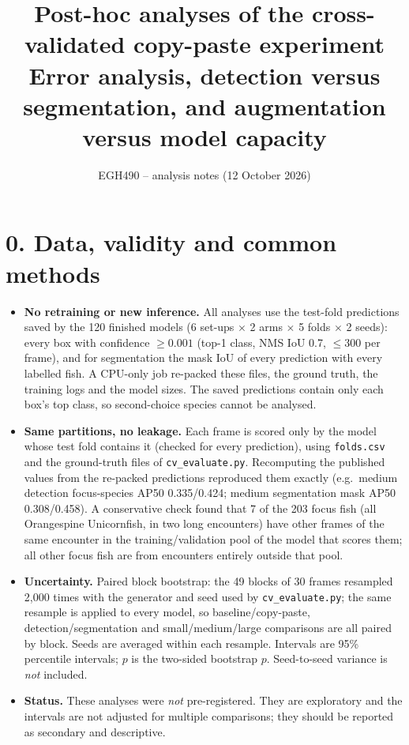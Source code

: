 \documentclass[11pt,a4paper]{article}
\title{\vspace{-12mm}Post-hoc analyses of the cross-validated copy-paste experiment\\\large Error analysis, detection versus segmentation, and augmentation versus model capacity}
\author{EGH490 -- analysis notes (12 October 2026)}\date{}
\begin{document}
\maketitle\vspace{-8mm}

\section*{0. Data, validity and common methods}
\begin{itemize}
\item \textbf{No retraining or new inference.} All analyses use the test-fold predictions saved by the 120 finished models
(6 set-ups $\times$ 2 arms $\times$ 5 folds $\times$ 2 seeds): every box with confidence $\geq 0.001$ (top-1 class, NMS IoU 0.7,
$\le$300 per frame), and for segmentation the mask IoU of every prediction with every labelled fish. A CPU-only job re-packed these
files, the ground truth, the training logs and the model sizes. The saved predictions contain only each box's top class, so
second-choice species cannot be analysed.
\item \textbf{Same partitions, no leakage.} Each frame is scored only by the model whose test fold contains it (checked for every
prediction), using \texttt{folds.csv} and the ground-truth files of \texttt{cv\_evaluate.py}. Recomputing the published values from
the re-packed predictions reproduced them exactly (e.g.\ medium detection focus-species AP50 0.335/0.424; medium segmentation mask
AP50 0.308/0.458). A conservative check found that 7 of the 203 focus fish (all Orangespine Unicornfish, in two long encounters)
have other frames of the same encounter in the training/validation pool of the model that scores them; all other focus fish are
from encounters entirely outside that pool.
\item \textbf{Uncertainty.} Paired block bootstrap: the 49 blocks of 30 frames resampled 2,000 times with the generator and seed used
by \texttt{cv\_evaluate.py}; the same resample is applied to every model, so baseline/copy-paste, detection/segmentation and
small/medium/large comparisons are all paired by block. Seeds are averaged within each resample. Intervals are 95\% percentile
intervals; $p$ is the two-sided bootstrap $p$. Seed-to-seed variance is \emph{not} included.
\item \textbf{Status.} These analyses were \emph{not} pre-registered. They are exploratory and the intervals are not adjusted for
multiple comparisons; they should be reported as secondary and descriptive.
\end{itemize}
\end{document}
